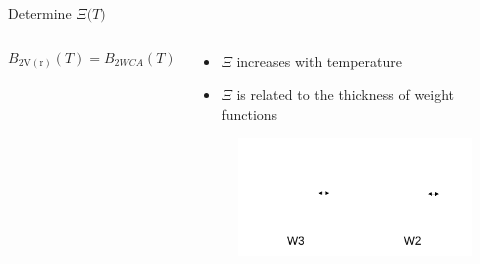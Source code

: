 \documentclass{beamer}
\begin{document}
\begin{frame}{Determine $\Xi{(}T)$}
\begin{columns}[t]
\begin{block}{}
			\begin{displaymath}B_{2\operatorname{V(r)}}(T) =B_{2WCA}(T)\end{displaymath}         
	    \end{block}
        \vspace{-0.5em}       
        \vspace{-0.5em}
        \begin{block}{}
        \begin{itemize}
			    \item $\Xi$ increases with temperature 
			    \item $\Xi$ is related to the thickness of weight functions
			\end{itemize}
	    \vspace{-2em} 
        \begin{figure}
            \centering
            \includegraphics[width=1.1\columnwidth]{figs/w2-w3-thickness}
          \end{figure}
	    \end{block}              
	\end{columns}	
\end{frame}
\end{document}
